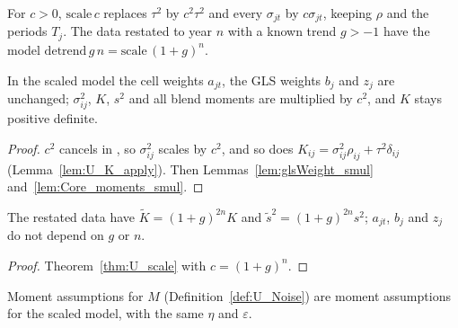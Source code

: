 \begin{definition}\label{def:U_scale}
  \leanok
  For $c > 0$, $\mathrm{scale}\,c$ replaces $\tau^2$ by $c^2\tau^2$ and every
  $\sigma_{jt}$ by $c\sigma_{jt}$, keeping $\rho$ and the periods $T_j$. The data
  restated to year $n$ with a known trend $g > -1$ have the model
  $\mathrm{detrend}\,g\,n = \mathrm{scale}\,(1+g)^n$.
\end{definition}

\begin{theorem}\label{thm:U_scale}
  \leanok
  In the scaled model the cell weights $a_{jt}$, the GLS weights $b_j$ and
  $z_j$ are unchanged; $\sigma^2_{ij}$, $K$, $s^2$ and all blend moments are
  multiplied by $c^2$, and $K$ stays positive definite.
\end{theorem}
\begin{proof}
  \leanok
  $c^2$ cancels in , so $\sigma^2_{ij}$ scales by $c^2$, and so does
  $K_{ij} = \sigma^2_{ij}\rho_{ij} + \tau^2\delta_{ij}$
  (Lemma~\ref{lem:U_K_apply}). Then Lemmas~\ref{lem:glsWeight_smul}
  and~\ref{lem:Core_moments_smul}.
\end{proof}

\begin{theorem}\label{thm:U_detrend}
  \leanok
  The restated data have $\tilde K = (1+g)^{2n}K$ and
  $\tilde s^2 = (1+g)^{2n}s^2$; $a_{jt}$, $b_j$ and $z_j$ do not depend on $g$ or $n$.
\end{theorem}
\begin{proof}
  \leanok
  Theorem~\ref{thm:U_scale} with $c = (1+g)^n$.
\end{proof}

\begin{definition}\label{def:U_Noise_scale}
  \leanok
  Moment assumptions for $M$ (Definition~\ref{def:U_Noise}) are moment
  assumptions for the scaled model, with the same $\eta$ and $\varepsilon$.
\end{definition}

